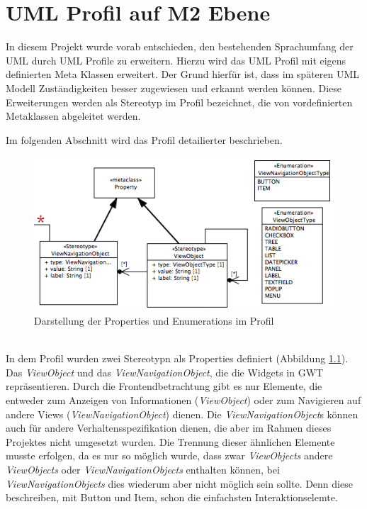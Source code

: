 \chapter{UML Profil auf M2 Ebene}
\label{UMLProfil}
In diesem Projekt wurde vorab entschieden, den bestehenden Sprachumfang der UML durch UML Profile zu erweitern. Hierzu wird das UML Profil mit eigens definierten Meta Klassen erweitert. Der Grund hierfür ist, dass im späteren UML Modell Zuständigkeiten besser zugewiesen und erkannt werden können. Diese Erweiterungen werden als Stereotyp im Profil bezeichnet, die von vordefinierten Metaklassen abgeleitet werden.

Im folgenden Abschnitt wird das Profil detailierter beschrieben.
\begin{figure}[ht]
\begin{center}
\includegraphics[width=\textwidth]{./img/ProfilProp.png}
\caption{Darstellung der Properties und Enumerations im
Profil}\label{Fig:UMLProfilProp}
\end{center}
\end{figure}\\
In dem Profil wurden zwei Stereotypn als Properties definiert (Abbildung \ref{Fig:UMLProfilProp}). Das \textit{ViewObject} und das \textit{ViewNavigationObject}, die die Widgets in GWT repräsentieren. Durch die Frontendbetrachtung gibt es nur Elemente, die entweder zum Anzeigen von Informationen (\textit{ViewObject}) oder zum Navigieren auf andere Views (\textit{ViewNavigationObject}) dienen. Die \textit{ViewNavigationObject}s können auch für andere Verhaltensspezifikation dienen, die aber im Rahmen dieses Projektes nicht umgesetzt wurden. Die Trennung dieser ähnlichen Elemente musste erfolgen, da es nur so möglich wurde, dass zwar \textit{ViewObjects} andere \textit{ViewObjects} oder \textit{ViewNavigationObjects} enthalten können, bei \textit{ViewNavigationObjects} dies wiederum aber nicht möglich sein sollte. Denn diese beschreiben, mit Button und Item, schon die einfachsten Interaktionselemte.
